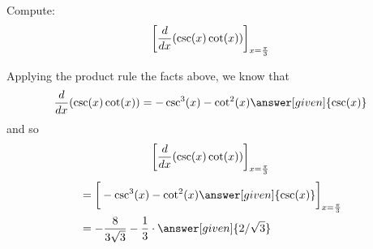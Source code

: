 \documentclass{ximera}
\begin{document}
\begin{example}
Compute:
\[
\bigg[ \frac{d}{\mathop{}\!d x} ( \csc(x) \cot(x) ) \bigg]_{x=\frac{\pi}{3}}
\]
\begin{explanation}
Applying the product rule the facts above, we know that
\[
\ddx ( \csc(x) \cot(x) ) = - \csc^3(x) - \cot^2(x)\answer[given]{\csc(x)}
\]
and so
\[
\bigg[ \frac{d}{\mathop{}\!d x} ( \csc(x) \cot(x) ) \bigg]_{x=\frac{\pi}{3}}
\]
\begin{align*}
  &= \eval{  - \csc^3(x) - \cot^2(x) \answer[given]{\csc(x)}}_{x=\frac{\pi}{3}}  \\
&= - \frac{8}{3 \sqrt{3}} - \frac{1}{3}\cdot \answer[given]{2/\sqrt{3}}
\end{align*}
\end{explanation}
\end{example}
\end{document}
